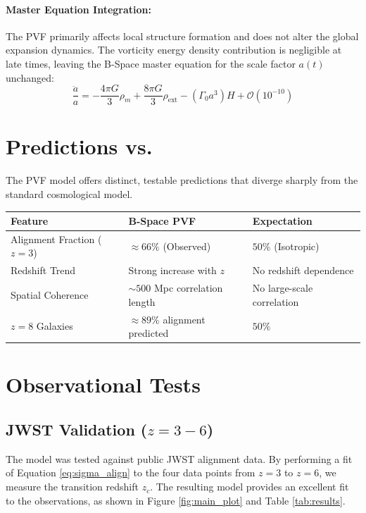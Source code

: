 \documentclass{BSpacePaper} %
\begin{document}
\paragraph{Master Equation Integration:} The PVF primarily affects local structure formation and does not alter the global expansion dynamics. The vorticity energy density contribution is negligible at late times, leaving the B-Space master equation for the scale factor $a(t)$ unchanged:
\begin{equation}
    \frac{\ddot{a}}{a} = -\frac{4\pi G}{3}\rho_m + \frac{8\pi G}{3}\rho_{\text{ext}} - (\Gamma_0 a^3)H + \mathcal{O}(10^{-10})
\end{equation}

\section{Predictions vs. \lcdm{}}
The PVF model offers distinct, testable predictions that diverge sharply from the standard cosmological model.
\begin{center}
    \captionsetup{type=table}
    \label{tab:predictions}
    \begin{tabular}{@{}lll@{}}
    \toprule
    \textbf{Feature} & \textbf{B-Space PVF} & \textbf{\lcdm{} Expectation} \\ \midrule
    Alignment Fraction ($z=3$) & $\approx 66\%$ (Observed) & $50\%$ (Isotropic) \\
    Redshift Trend & Strong increase with $z$ & No redshift dependence \\
    Spatial Coherence & $\sim 500$ Mpc correlation length & No large-scale correlation \\
    $z=8$ Galaxies & $\approx 89\%$ alignment predicted & $50\%$ \\ \bottomrule
    \end{tabular}
\end{center}

\section{Observational Tests}

\subsection{JWST Validation ($z=3-6$)}
The model was tested against public JWST alignment data. By performing a fit of Equation \ref{eq:sigma_align} to the four data points from $z=3$ to $z=6$, we measure the transition redshift $z_c$. The resulting model provides an excellent fit to the observations, as shown in Figure \ref{fig:main_plot} and Table \ref{tab:results}.
\end{document}
